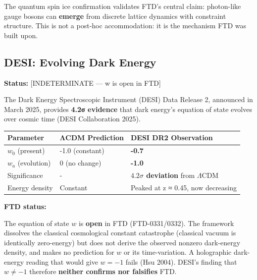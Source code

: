 \documentclass[
  11pt,
  letterpaper,
  twoside,
  openright]{book}
\begin{document}
\begin{tcolorbox}[enhanced jigsaw, coltitle=black, colbacktitle=quarto-callout-important-color!10!white, toprule=.15mm, colframe=quarto-callout-important-color-frame, arc=.35mm, opacityback=0, bottomtitle=1mm, toptitle=1mm, breakable, colback=white, titlerule=0mm, opacitybacktitle=0.6, title=\textcolor{quarto-callout-important-color}{\faExclamation}\hspace{0.5em}{Validation of Core Mechanism}, rightrule=.15mm, bottomrule=.15mm, leftrule=.75mm, left=2mm]

The quantum spin ice confirmation validates FTD's central claim:
photon-like gauge bosons can \textbf{emerge} from discrete lattice
dynamics with constraint structure. This is not a post-hoc
accommodation: it is the mechanism FTD was built upon.

\end{tcolorbox}

\subsection{DESI: Evolving Dark Energy}\label{sec-desi-dark-energy}

\textbf{Status:} {[}INDETERMINATE --- w is open in FTD{]}

The Dark Energy Spectroscopic Instrument (DESI) Data Release 2,
announced in March 2025, provides \textbf{4.2σ evidence} that dark
energy's equation of state evolves over cosmic time (DESI Collaboration
2025).

\begin{longtable}[]{@{}lll@{}}
\toprule\noalign{}
Parameter & ΛCDM Prediction & DESI DR2 Observation \\
\midrule\noalign{}
\endhead
\bottomrule\noalign{}
\endlastfoot
\(w_0\) (present) & -1.0 (constant) & \textbf{-0.7} \\
\(w_a\) (evolution) & 0 (no change) & \textbf{-1.0} \\
Significance & - & \textbf{\(4.2\sigma\) deviation} from
\(\Lambda\)CDM \\
Energy density & Constant & Peaked at z ≈ 0.45, now decreasing \\
\end{longtable}

\textbf{FTD status:}

The equation of state \(w\) is \textbf{open} in FTD (FTD-0331/0332). The
framework dissolves the classical cosmological constant catastrophe
(classical vacuum is identically zero-energy) but does not derive the
observed nonzero dark-energy density, and makes no prediction for \(w\)
or its time-variation. A holographic dark-energy reading that would give
\(w = -1\) fails (Hsu 2004). DESI's finding that \(w \neq -1\) therefore
\textbf{neither confirms nor falsifies} FTD.
\end{document}
